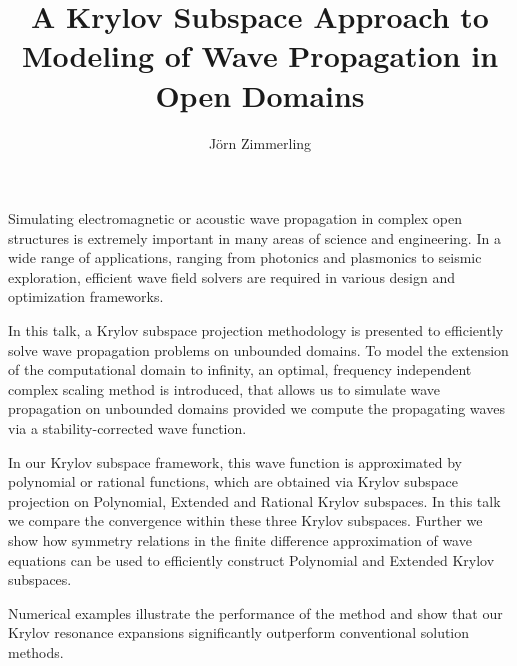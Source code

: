 \documentclass{article}
\title{A Krylov Subspace Approach to Modeling of Wave Propagation in Open Domains}
\author{J\"orn Zimmerling}
\affil{PhD student at TU Delft}
\date{}
\begin{document}
\maketitle
\setcounter{page}{8}
Simulating electromagnetic or acoustic wave propagation in complex open structures is extremely important in many areas of science and engineering. In a wide range of applications, ranging from photonics and plasmonics to seismic exploration, efficient wave field solvers are required in various design and optimization frameworks.  
 
In this talk, a Krylov subspace projection methodology is presented to efficiently solve wave propagation problems on unbounded domains. To model the extension of the computational domain to infinity, an optimal, frequency independent complex scaling method is introduced, that allows us to simulate wave propagation on unbounded domains provided we compute the propagating waves via a stability-corrected wave function.

In our Krylov subspace framework, this wave function is approximated by polynomial or rational functions, which are obtained via Krylov subspace projection on Polynomial, Extended and Rational Krylov subspaces. In this talk we compare the convergence within these three Krylov subspaces. Further we show how symmetry relations in the finite difference approximation of wave equations can be used to efficiently construct Polynomial and Extended Krylov subspaces. 

Numerical examples illustrate the performance of the method and show that our Krylov resonance expansions significantly outperform conventional solution methods.
\end{document}
